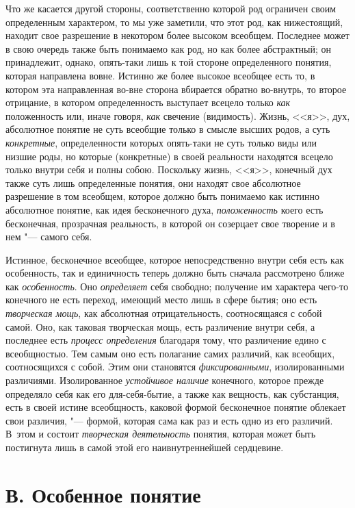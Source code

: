 Что же касается другой стороны, соответственно которой род
ограничен своим определенным характером, то мы уже заметили, что
этот род, как нижестоящий, находит свое разрешение в
некотором более высоком всеобщем. Последнее может в свою очередь также быть
понимаемо как род, но как более абстрактный; он принадлежит, однако,
опять-таки лишь к той стороне определенного понятия, которая направлена
вовне. Истинно же более высокое всеобщее есть то, в котором эта
направленная во-вне сторона вбирается обратно во-внутрь, то второе
отрицание, в котором определенность выступает всецело только
{\em как} положенность
или, иначе говоря, {\em как}
свечение (видимость). Жизнь, <<я>>, дух, абсолютное понятие не
суть всеобщие только в смысле высших родов, а суть
{\em конкретные},
определенности которых опять-таки не суть только виды или
низшие роды, но которые (конкретные) в своей реальности находятся всецело
только внутри себя и полны собою. Поскольку жизнь, <<я>>, конечный дух также
суть лишь определенные понятия, они находят свое абсолютное разрешение в
том всеобщем, которое должно быть понимаемо как истинно абсолютное понятие,
как идея бесконечного духа,
{\em положенность} коего
есть бесконечная, прозрачная реальность, в которой он созерцает свое
творение и в нем "--- самого себя.

Истинное, бесконечное всеобщее, которое непосредственно внутри
себя есть как особенность, так и единичность теперь должно быть сначала
рассмотрено ближе как
{\em особенность}. Оно
{\em определяет} себя
свободно; получение им характера чего-то конечного не есть переход, имеющий
место лишь в сфере бытия; оно есть
{\em творческая мощь},
как абсолютная отрицательность, соотносящаяся с собой самой.
Оно, как таковая творческая мощь, есть различение внутри себя, а последнее
есть {\em процесс определения}
благодаря тому, что различение едино с всеобщностью. Тем
самым оно есть полагание самих различий, как всеобщих, соотносящихся с
собой. Этим они становятся
{\em фиксированными},
изолированными различиями. Изолированное
{\em устойчивое наличие}
конечного, которое прежде определяло себя как его
для-себя-бытие, а также как вещность, как субстанция, есть в своей истине
всеобщность, каковой формой бесконечное понятие облекает свои различия, "---
формой, которая сама как раз и есть одно из его различий.
В~этом и состоит {\em творческая
деятельность} понятия, которая может быть постигнута лишь в
самой этой его наивнутреннейшей сердцевине.

\section[В. Особенное понятие]{В. Особенное понятие}

